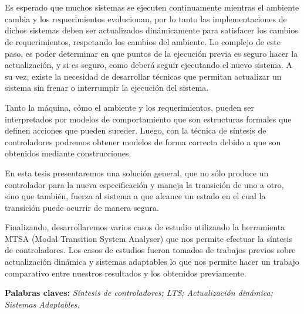 \chapter*{\runtitulo}

\noindent Es esperado que muchos sistemas se ejecuten continuamente mientras el ambiente cambia y los requerimientos
evolucionan, por lo tanto las implementaciones de dichos sistemas deben ser actualizados dinámicamente para satisfacer
los cambios de requerimientos, respetando los cambios del ambiente. Lo complejo de este paso, es poder determinar en que
puntos de la ejecución previa es seguro hacer la actualización, y si es seguro, como deberá seguir ejecutando el nuevo
sistema. A su vez, existe la necesidad de desarrollar técnicas que permitan actualizar un sistema sin frenar o
interrumpir la ejecución del sistema.

\noindent Tanto la máquina, cómo el ambiente y los requerimientos, pueden ser interpretados por modelos de
comportamiento que son estructuras formales que definen acciones que pueden suceder. Luego, con la técnica de síntesis de
controladores podremos obtener modelos de forma correcta debido a que son obtenidos mediante construcciones.

\noindent En esta tesis presentaremos una solución general, que no sólo produce un controlador para la nueva
especificación y maneja la transición de uno a otro, sino que también, fuerza al sistema a que alcance un estado en el
cual la transición puede ocurrir de manera segura.

\noindent Finalizando, desarrollaremos varios casos de estudio utilizando la herramienta MTSA (Modal Transition System
Analyser) que nos permite efectuar la síntesis de controladores. Los casos de estudios fueron tomados de trabajos
previos sobre actualización dinámica y sistemas adaptables lo que nos permite hacer un trabajo comparativo entre
nuestros resultados y los obtenidos previamente.

 
\bigskip

\noindent\textbf{Palabras claves:} \textit{Síntesis de controladores; LTS; Actualización dinámica; Sistemas Adaptables.}

